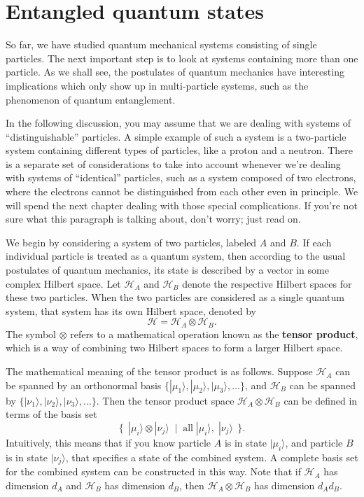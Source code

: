 \documentclass[pra,11pt]{revtex4}
\begin{document}
\section{Entangled quantum states}

So far, we have studied quantum mechanical systems consisting of
single particles.  The next important step is to look at systems
containing more than one particle.  As we shall see, the postulates of
quantum mechanics have interesting implications which only show up in
multi-particle systems, such as the phenomenon of quantum
entanglement.

In the following discussion, you may assume that we are dealing with
systems of ``distinguishable'' particles.  A simple example of such a
system is a two-particle system containing different types of
particles, like a proton and a neutron.  There is a separate set of
considerations to take into account whenever we're dealing with
systems of ``identical'' particles, such as a system composed of two
electrons, where the electrons cannot be distinguished from each other
even in principle.  We will spend the next chapter dealing with those
special complications.  If you're not sure what this paragraph is
talking about, don't worry; just read on.

We begin by considering a system of two particles, labeled $A$ and
$B$.  If each individual particle is treated as a quantum system, then
according to the usual postulates of quantum mechanics, its state is
described by a vector in some complex Hilbert space.  Let
$\mathscr{H}_A$ and $\mathscr{H}_B$ denote the respective Hilbert
spaces for these two particles.  When the two particles are considered
as a single quantum system, that system has its own Hilbert space,
denoted by
$$\mathscr{H} = \mathscr{H}_A\otimes \mathscr{H}_B.$$
The symbol $\otimes$ refers to a mathematical operation known as the
\textbf{tensor product}, which is a way of combining two Hilbert
spaces to form a larger Hilbert space.

The mathematical meaning of the tensor product is as follows.  Suppose
$\mathscr{H}_A$ can be spanned by an orthonormal basis
$\{|\mu_1\rangle, |\mu_2\rangle, |\mu_3\rangle, \dots\}$, and
$\mathscr{H}_B$ can be spanned by $\{|\nu_1\rangle, |\nu_2\rangle,
|\nu_3\rangle, \dots\}$.  Then the tensor product space $\mathscr{H}_A
\otimes \mathscr{H}_B$ can be defined in terms of the basis set
$$\Big\{\;\,|\mu_i\rangle\otimes|\nu_j\rangle \;\;  \Big| \;\; \textrm{all}\;|\mu_i\rangle,\; |\nu_j\rangle \;\,\Big\}.$$
Intuitively, this means that if you know particle $A$ is in state
$|\mu_i\rangle$, and particle $B$ is in state $|\nu_j\rangle$, that
specifies a state of the combined system.  A complete basis set for
the combined system can be constructed in this way.  Note that if
$\mathscr{H}_A$ has dimension $d_A$ and $\mathscr{H}_B$ has dimension
$d_B$, then $\mathscr{H}_A \otimes \mathscr{H}_B$ has dimension $d_A
d_B$.
\end{document}
